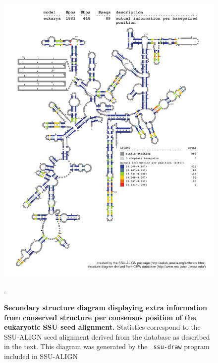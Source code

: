 \begin{figure}
\begin{center}
\includegraphics[width=5.7in]{Figures/eukarya-0p1-mutinfo}
\end{center}
\caption[Secondary structure diagram displaying extra information 
  from conserved structure per consensus position of the eukaryotic SSU seed
  alignment]{\textbf{Secondary structure diagram displaying extra
  information from conserved structure per consensus position of the eukaryotic SSU seed
  alignment.} Statistics correspond to the SSU-ALIGN seed
  alignment derived from the  database \cite{CannoneGutell02}
  as described in the text. This diagram was generated by the {\tt
  ssu-draw} program included in SSU-ALIGN}.
\label{fig:euksinfo}
\end{figure}

\newpage 

